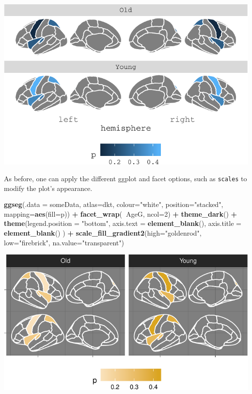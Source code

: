 \documentclass[fleqn,10pt]{wlpeerj} %
\newenvironment{Shaded}{\begin{snugshade}}{\end{snugshade}}
\newcommand{\DataTypeTok}[1]{\textcolor[rgb]{0.13,0.29,0.53}{#1}}
\newcommand{\DecValTok}[1]{\textcolor[rgb]{0.00,0.00,0.81}{#1}}
\newcommand{\KeywordTok}[1]{\textcolor[rgb]{0.13,0.29,0.53}{\textbf{#1}}}
\newcommand{\NormalTok}[1]{#1}
\newcommand{\OperatorTok}[1]{\textcolor[rgb]{0.81,0.36,0.00}{\textbf{#1}}}
\newcommand{\StringTok}[1]{\textcolor[rgb]{0.31,0.60,0.02}{#1}}
\begin{document}
\includegraphics{draft_2_files/figure-latex/datasupp3-1.pdf}

As before, one can apply the different ggplot and facet options, such as \texttt{scales} to modify the plot's appearance.

\begin{Shaded}
\begin{Highlighting}[]
\KeywordTok{ggseg}\NormalTok{(}\DataTypeTok{.data =}\NormalTok{ someData, }\DataTypeTok{atlas=}\NormalTok{dkt,}
      \DataTypeTok{colour=}\StringTok{"white"}\NormalTok{, }\DataTypeTok{position=}\StringTok{"stacked"}\NormalTok{,}
      \DataTypeTok{mapping=}\KeywordTok{aes}\NormalTok{(}\DataTypeTok{fill=}\NormalTok{p)) }\OperatorTok{+}
\StringTok{  }\KeywordTok{facet_wrap}\NormalTok{(}\OperatorTok{~}\NormalTok{AgeG, }\DataTypeTok{ncol=}\DecValTok{2}\NormalTok{) }\OperatorTok{+}
\StringTok{  }\KeywordTok{theme_dark}\NormalTok{() }\OperatorTok{+}
\StringTok{  }\KeywordTok{theme}\NormalTok{(}\DataTypeTok{legend.position =} \StringTok{"bottom"}\NormalTok{,}
        \DataTypeTok{axis.text =} \KeywordTok{element_blank}\NormalTok{(),}
        \DataTypeTok{axis.title =} \KeywordTok{element_blank}\NormalTok{()}
\NormalTok{        ) }\OperatorTok{+}
\StringTok{  }\KeywordTok{scale_fill_gradient2}\NormalTok{(}\DataTypeTok{high=}\StringTok{"goldenrod"}\NormalTok{,}
                       \DataTypeTok{low=}\StringTok{"firebrick"}\NormalTok{,}
                       \DataTypeTok{na.value=}\StringTok{"transparent"}\NormalTok{)}
\end{Highlighting}
\end{Shaded}

\includegraphics{draft_2_files/figure-latex/datasupp5-1.pdf}
\end{document}
